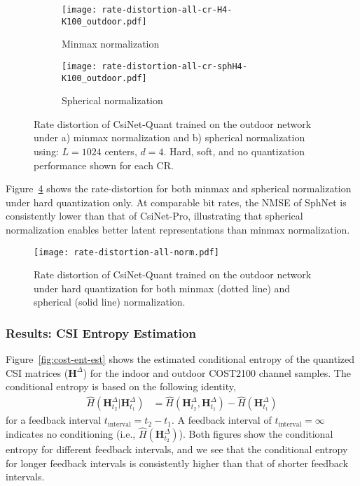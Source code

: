 \begin{figure}[htb] \centering 
	\begin{subfigure}[t]{.48\textwidth}
		\texttt{[image: rate-distortion-all-cr-H4-K100\_outdoor.pdf]}
		\caption{Minmax normalization} 
		\label{fig:rate-distortion-minmax} 
	\end{subfigure}
	\begin{subfigure}[t]{.48\textwidth}
		\texttt{[image: rate-distortion-all-cr-sphH4-K100\_outdoor.pdf]}
		\caption{Spherical normalization} 
		\label{fig:rate-distortion-sph} 
	\end{subfigure}
	\caption{Rate distortion of CsiNet-Quant trained on the outdoor network under a) minmax normalization and b) spherical normalization using: $L=1024$ centers, $d=4$. Hard, soft, and no quantization performance shown for each CR.} 
  	\label{fig:rate-distortion-softquant} 
\end{figure}

Figure~\ref{fig:rate-distortion-norms} shows the rate-distortion for both minmax and spherical normalization under hard quantization only. At comparable bit rates, the NMSE of SphNet is consistently lower than that of CsiNet-Pro, illustrating that spherical normalization enables better latent representations than minmax normalization.

\begin{figure}[htb] \centering 
  \texttt{[image: rate-distortion-all-norm.pdf]}
  \caption{Rate distortion of CsiNet-Quant trained on the outdoor network under hard quantization for both minmax (dotted line) and spherical (solid line) normalization.} 
  \label{fig:rate-distortion-norms} 
\end{figure}

\subsubsection{Results: CSI Entropy Estimation} \label{sec:results-ent-estimation}

Figure~\ref{fig:cost-ent-est} shows the estimated conditional entropy of the quantized CSI matrices ($\mathbf H^{\Delta}$) for the indoor and outdoor COST2100 channel samples. The conditional entropy is based on the following identity,
\begin{align*}
	\hat H(\mathbf H^\Delta_{t_2} | \mathbf H^\Delta_{t_1}) &= \hat H(\mathbf H^\Delta_{t_2}, \mathbf H^\Delta_{t_1}) - \hat H(\mathbf H^\Delta_{t_1})
\end{align*}
for a feedback interval $t_{\text{interval}} = t_2 - t_1$. A feedback interval of $t_{\text{interval}} = \infty$ indicates no conditioning (i.e., $\hat H(\mathbf H^\Delta_{t_2})$). Both figures show the conditional entropy for different feedback intervals, and we see that the conditional entropy for longer feedback intervals is consistently higher than that of shorter feedback intervals. 

